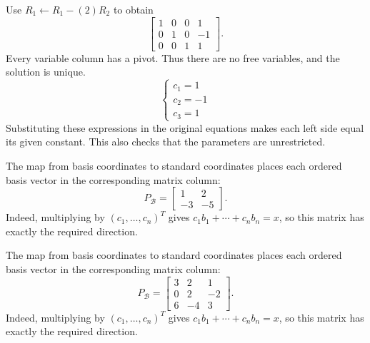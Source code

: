 Use $R_{1}\leftarrow R_{1}-(2)R_{2}$ to obtain
\[ \left[\begin{array}{rrr|r}1&0&0&1\\0&1&0&-1\\0&0&1&1\end{array}\right].\]
Every variable column has a pivot. Thus there are no free variables, and the solution is unique.
\[ \begin{cases}c_{1}=1\\c_{2}=-1\\c_{3}=1\end{cases}\]
Substituting these expressions in the original equations makes each left side equal its given constant. This also checks that the parameters are unrestricted.

The map from basis coordinates to standard coordinates places each ordered basis vector in the corresponding matrix column:
\[P_{\mathcal B}=\left[\begin{array}{rr}1&2\\-3&-5\end{array}\right].\]
Indeed, multiplying by $(c_1,\ldots,c_n)^T$ gives $c_1b_1+\cdots+c_nb_n=x$, so this matrix has exactly the required direction.

The map from basis coordinates to standard coordinates places each ordered basis vector in the corresponding matrix column:
\[P_{\mathcal B}=\left[\begin{array}{rrr}3&2&1\\0&2&-2\\6&-4&3\end{array}\right].\]
Indeed, multiplying by $(c_1,\ldots,c_n)^T$ gives $c_1b_1+\cdots+c_nb_n=x$, so this matrix has exactly the required direction.

